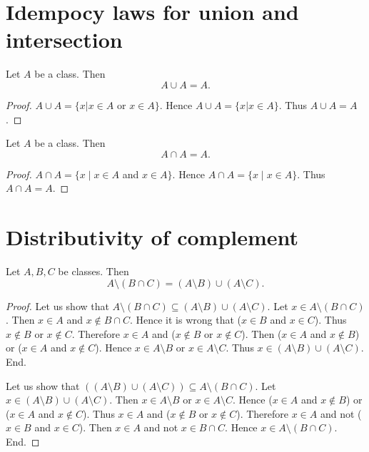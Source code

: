 \documentclass[../set-theory.tex]{subfiles}
\begin{document}
  \section*{Idempocy laws for union and intersection}

  \begin{forthel}
    \begin{proposition}\label{SET_THEORY_02_2096996737351680}
      Let $A$ be a class.
      Then \[ A \cup A = A. \]
    \end{proposition}
    \begin{proof}
      $A \cup A = \{x | x \in A$ or $x \in A \}$.
      Hence $A \cup A = \{ x | x \in A \}$.
      Thus $A \cup A = A$.
    \end{proof}
  \end{forthel}

  \begin{forthel}
    \begin{proposition}\label{SET_THEORY_02_4053144145231872}
      Let $A$ be a class.
      Then \[ A \cap A = A. \]
    \end{proposition}
    \begin{proof}
      $A \cap A = \{ x \mid x \in A$ and $x \in A \}$.
      Hence $A \cap A = \{ x \mid x \in A \}$.
      Thus $A \cap A = A$.
    \end{proof}
  \end{forthel}


  \section*{Distributivity of complement}

  \begin{forthel}
    \begin{proposition}\label{SET_THEORY_02_5296031436636160}
      Let $A, B, C$ be classes.
      Then \[ A \setminus (B \cap C) = (A \setminus B) \cup (A \setminus C). \]
    \end{proposition}
    \begin{proof}
      Let us show that $A \setminus (B \cap C) \subseteq (A \setminus B) \cup (A \setminus C)$.
        Let $x \in A \setminus (B \cap C)$.
        Then $x \in A$ and $x \notin B \cap C$.
        Hence it is wrong that ($x \in B$ and $x \in C$).
        Thus $x \notin B$ or $x \notin C$.
        Therefore $x \in A$ and ($x \notin B$ or $x \notin C$).
        Then ($x \in A$ and $x \notin B$) or ($x \in A$ and $x \notin C$).
        Hence $x \in A \setminus B$ or $x \in A \setminus C$.
        Thus $x \in (A \setminus B) \cup (A \setminus C)$.
      End.

      Let us show that $((A \setminus B) \cup (A \setminus C)) \subseteq A \setminus (B \cap C)$. %
        Let $x \in (A \setminus B) \cup (A \setminus C)$.
        Then $x \in A \setminus B$ or $x \in A \setminus C$.
        Hence ($x \in A$ and $x \notin B$) or ($x \in A$ and $x \notin C$).
        Thus $x \in A$ and ($x \notin B$ or $x \notin C$).
        Therefore $x \in A$ and not ($x \in B$ and $x \in C$).
        Then $x \in A$ and not $x \in B \cap C$.
        Hence $x \in A \setminus (B \cap C)$.
      End.
    \end{proof}
  \end{forthel}
\end{document}
